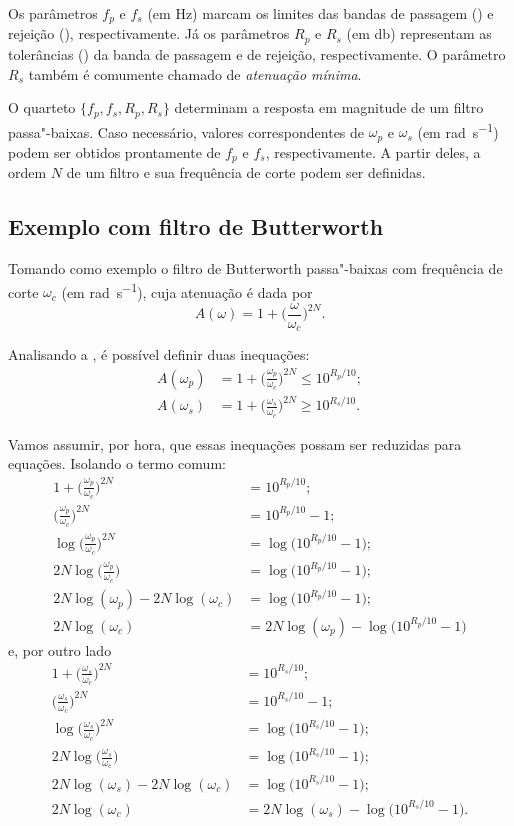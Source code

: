 Os parâmetros $f_p$ e $f_s$ (em \unit{\hertz}) marcam os limites das bandas de passagem () e rejeição (), respectivamente. Já os parâmetros $R_p$ e $R_s$ (em \unit{\decibel}) representam as tolerâncias () da banda de passagem e de rejeição, respectivamente. O parâmetro $R_s$ também é comumente chamado de \emph{atenuação mínima}.

O quarteto $\{f_p,f_s,R_p,R_s\}$ determinam a resposta em magnitude de um filtro passa"-baixas. Caso necessário, valores correspondentes de $\omega_p$ e $\omega_s$ (em \unit{\radian\per\second}) podem ser obtidos prontamente de $f_p$ e $f_s$, respectivamente. A partir deles, a ordem $N$ de um filtro e sua frequência de corte podem ser definidas.

\subsection{Exemplo com filtro de Butterworth}

Tomando como exemplo o filtro de Butterworth passa"-baixas com frequência de corte $\omega_c$ (em \unit{\radian\per\second}), cuja atenuação é dada por
\begin{equation}
	A(\omega)=1+\Big(\frac{\omega}{\omega_c}\Big)^{2N}.
\end{equation}

Analisando a , é possível definir duas inequações:
\begin{align}
	A(\omega_p)&=1+\Big(\frac{\omega_p}{\omega_c}\Big)^{2N}\leq10^{R_p/10};\\
	A(\omega_s)&=1+\Big(\frac{\omega_s}{\omega_c}\Big)^{2N}\geq10^{R_s/10}.
\end{align}

Vamos assumir, por hora, que essas inequações possam ser reduzidas para equações. Isolando o termo comum:
\begin{align*}
	1+\Big(\frac{\omega_p}{\omega_c}\Big)^{2N}&=10^{R_p/10};\\
	\Big(\frac{\omega_p}{\omega_c}\Big)^{2N}&=10^{R_p/10}-1;\\
	\log\Big(\frac{\omega_p}{\omega_c}\Big)^{2N}&=\log\big(10^{R_p/10}-1\big);\\
	2N\log\Big(\frac{\omega_p}{\omega_c}\Big)&=\log\big(10^{R_p/10}-1\big);\\
	2N\log(\omega_p)-2N\log(\omega_c)&=\log\big(10^{R_p/10}-1\big);\\
	2N\log(\omega_c)&=2N\log(\omega_p)-\log\big(10^{R_p/10}-1\big)
\end{align*}
e, por outro lado
\begin{align*}
	1+\Big(\frac{\omega_s}{\omega_c}\Big)^{2N}&=10^{R_s/10};\\
	\Big(\frac{\omega_s}{\omega_c}\Big)^{2N}&=10^{R_s/10}-1;\\
	\log\Big(\frac{\omega_s}{\omega_c}\Big)^{2N}&=\log\big(10^{R_s/10}-1\big);\\
	2N\log\Big(\frac{\omega_s}{\omega_c}\Big)&=\log\big(10^{R_s/10}-1\big);\\
	2N\log(\omega_s)-2N\log(\omega_c)&=\log\big(10^{R_s/10}-1\big);\\
	2N\log(\omega_c)&=2N\log(\omega_s)-\log\big(10^{R_s/10}-1\big).
\end{align*}

